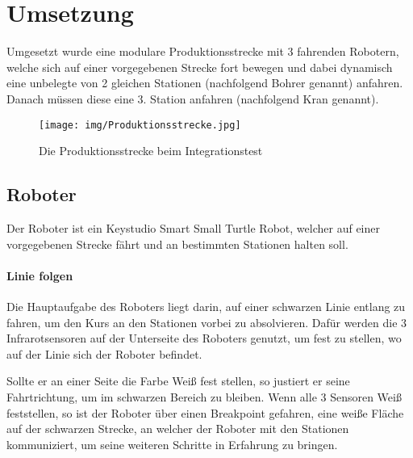 \chapter{Umsetzung}
Umgesetzt wurde eine modulare Produktionsstrecke mit 3 fahrenden Robotern, welche sich auf einer vorgegebenen Strecke fort bewegen und dabei dynamisch eine unbelegte von 2 gleichen Stationen (nachfolgend Bohrer genannt) anfahren. Danach müssen diese eine 3. Station anfahren (nachfolgend Kran genannt).
\begin{figure}[h]
\begin{center}
\texttt{[image: img/Produktionsstrecke.jpg]}
\caption{Die Produktionsstrecke beim Integrationstest}
\end{center}
\end{figure}

\section{Roboter}
Der Roboter ist ein Keystudio Smart Small Turtle Robot, welcher auf einer vorgegebenen Strecke fährt und an bestimmten Stationen halten soll.
\subsubsection{Linie folgen}
Die Hauptaufgabe des Roboters liegt darin, auf einer schwarzen Linie entlang zu fahren, um den Kurs an den Stationen vorbei zu absolvieren. Dafür werden die 3 Infrarotsensoren auf der Unterseite des Roboters genutzt, um fest zu stellen, wo auf der Linie sich der Roboter befindet.

Sollte er an einer Seite die Farbe Weiß fest stellen, so justiert er seine Fahrtrichtung, um im schwarzen Bereich zu bleiben. Wenn alle 3 Sensoren Weiß feststellen, so ist der Roboter über einen Breakpoint gefahren, eine weiße Fläche auf der schwarzen Strecke, an welcher der Roboter mit den Stationen kommuniziert, um seine weiteren Schritte in Erfahrung zu bringen.

